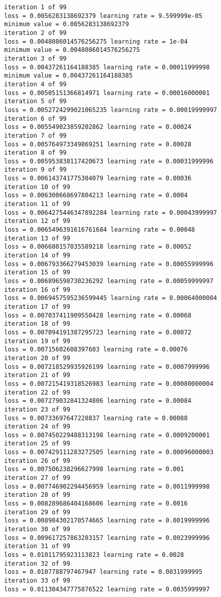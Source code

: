 \documentclass[11pt]{article}
\begin{document}
    \begin{Verbatim}[commandchars=\\\{\}]
iteration 1 of 99
loss = 0.0056283138692379 learning rate = 9.599999e-05
minimum value = 0.0056283138692379
iteration 2 of 99
loss = 0.0048086014576256275 learning rate = 1e-04
minimum value = 0.0048086014576256275
iteration 3 of 99
loss = 0.00437261164188385 learning rate = 0.00011999998
minimum value = 0.00437261164188385
iteration 4 of 99
loss = 0.00505151366814971 learning rate = 0.00016000001
iteration 5 of 99
loss = 0.0052724299021065235 learning rate = 0.00019999997
iteration 6 of 99
loss = 0.005549023859202862 learning rate = 0.00024
iteration 7 of 99
loss = 0.005764973349869251 learning rate = 0.00028
iteration 8 of 99
loss = 0.005953838117420673 learning rate = 0.00031999996
iteration 9 of 99
loss = 0.006143741775304079 learning rate = 0.00036
iteration 10 of 99
loss = 0.006300668697804213 learning rate = 0.0004
iteration 11 of 99
loss = 0.0064275446347892284 learning rate = 0.00043999997
iteration 12 of 99
loss = 0.0065496391616761684 learning rate = 0.00048
iteration 13 of 99
loss = 0.006680157035589218 learning rate = 0.00052
iteration 14 of 99
loss = 0.006793366279453039 learning rate = 0.00055999996
iteration 15 of 99
loss = 0.006896598730236292 learning rate = 0.00059999997
iteration 16 of 99
loss = 0.0069457595236599445 learning rate = 0.00064000004
iteration 17 of 99
loss = 0.007037411909550428 learning rate = 0.00068
iteration 18 of 99
loss = 0.007094191387295723 learning rate = 0.00072
iteration 19 of 99
loss = 0.00715602608397603 learning rate = 0.00076
iteration 20 of 99
loss = 0.007218529935926199 learning rate = 0.0007999996
iteration 21 of 99
loss = 0.007215419318526983 learning rate = 0.00080000004
iteration 22 of 99
loss = 0.007279032841324806 learning rate = 0.00084
iteration 23 of 99
loss = 0.00733697647228837 learning rate = 0.00088
iteration 24 of 99
loss = 0.007450229488313198 learning rate = 0.0009200001
iteration 25 of 99
loss = 0.007429111283272505 learning rate = 0.00096000003
iteration 26 of 99
loss = 0.007506238296627998 learning rate = 0.001
iteration 27 of 99
loss = 0.007746902294456959 learning rate = 0.0011999998
iteration 28 of 99
loss = 0.008289686404168606 learning rate = 0.0016
iteration 29 of 99
loss = 0.008984302170574665 learning rate = 0.0019999996
iteration 30 of 99
loss = 0.009617257863283157 learning rate = 0.0023999996
iteration 31 of 99
loss = 0.01011795923113823 learning rate = 0.0028
iteration 32 of 99
loss = 0.0107788797467947 learning rate = 0.0031999995
iteration 33 of 99
loss = 0.011304347775876522 learning rate = 0.0035999997

\end{Verbatim}
\end{document}
